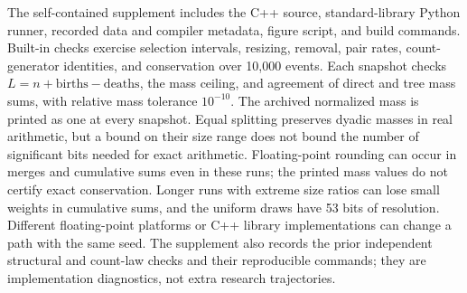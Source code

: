 The self-contained supplement includes the C++ source, standard-library
Python runner, recorded data and compiler metadata, figure script, and
build commands. Built-in checks exercise selection intervals, resizing,
removal, pair rates, count-generator identities, and conservation over
10,000 events. Each snapshot checks $L=n+\mathrm{births}-\mathrm{deaths}$,
the mass ceiling, and agreement of direct and tree mass sums, with relative
mass tolerance $10^{-10}$. The archived normalized mass is printed as one
at every snapshot. Equal splitting preserves dyadic masses in real
arithmetic, but a bound on their size range does not bound the number of
significant bits needed for exact arithmetic. Floating-point rounding can
occur in merges and cumulative sums even in these runs; the printed mass
values do not certify exact conservation. Longer runs with extreme size
ratios can lose small weights in cumulative sums, and the uniform draws
have 53 bits of resolution. Different
floating-point platforms or C++ library implementations can change a path
with the same seed. The supplement also records the prior independent
structural and count-law checks and their reproducible commands; they are
implementation diagnostics, not extra research trajectories.
